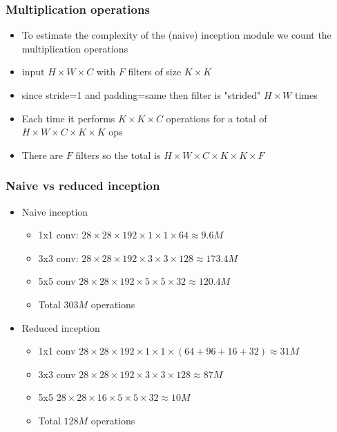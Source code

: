 \documentclass{beamer}
\begin{document}
\begin{frame}
	\frametitle{Multiplication operations}

	\begin{itemize}
		\item To estimate the complexity of the (naive) inception module we count the multiplication operations
		\item input $H\times W\times C$ with $F$ filters of size $K\times K$
		\item since stride=1 and padding=same then filter is "strided" $H\times W$ times
		\item Each time it performs $K\times K \times C$ operations for a total of $H\times W\times C\times K\times K$ ops 
		\item There are $F$ filters so the total is $H\times W\times C\times K\times K\times F$
	\end{itemize}

\end{frame}
\begin{frame}
	\frametitle{Naive vs reduced inception }
	\begin{itemize}
		\item Naive inception
		\begin{itemize}
			\item 1x1 conv: $28\times 28\times 192\times 1 \times 1\times 64\approx 9.6M$
			\item 3x3 conv: $28\times 28\times 192\times 3 \times 3\times 128\approx 173.4M$
			\item 5x5 conv $28\times 28\times 192\times 5 \times 5\times 32\approx 120	.4M$
			\item Total $303M$ operations
		\end{itemize}
		\item Reduced inception
	
\begin{itemize}
	\item 1x1 conv $28\times 28\times 192\times 1\times 1 \times(64+96+16+32)\approx 31 M$
	\item 3x3 conv $28\times 28\times 192\times 3\times 3\times 128\approx 87M$
	\item 5x5 $28\times 28\times 16\times 5\times 5\times 32\approx 10M$

	\item Total $128M$ operations
\end{itemize}
\end{itemize}

\end{frame}
\end{document}
